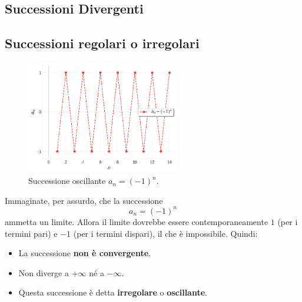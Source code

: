 \subsection{Successioni Divergenti}\label{successioni-divergenti}


\subsection{Successioni regolari o irregolari}\label{successioni-regolari-o-irregolari}

\begin{figure}[H]
    \centering
    \includegraphics[width=0.6\textwidth]{img/succ_osc_1_-1.png}
    \caption{Successione oscillante $a_n = (-1)^n$.}
\end{figure}
Immaginate, per assurdo, che la successione
\[a_n = (-1)^n\]
ammetta un limite.
Allora il limite dovrebbe essere contemporaneamente $1$ (per i termini pari) e $-1$ (per i termini dispari), il che è impossibile.
Quindi:
\begin{itemize}
    \item La successione \textbf{non è convergente}.
    \item Non diverge a $+\infty$ né a $-\infty$.
    \item Questa successione è detta \textbf{irregolare} o \textbf{oscillante}.
\end{itemize}

